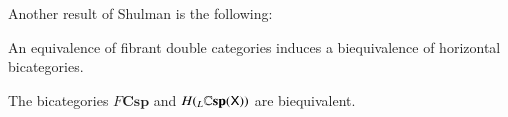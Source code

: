 \documentclass[reqno]{amsart}
\begin{document}
Another result of Shulman \cite{Shulman2010} is the following:
\begin{lem}
An equivalence of fibrant double categories induces a biequivalence of horizontal bicategories.
\end{lem}

\begin{cor}
The bicategories $F\mathbf{Csp}$ and $H( {_L \mathbf{\mathbb Csp}(\mathsf{X})})$ are biequivalent.
\end{cor}

\end{document}
